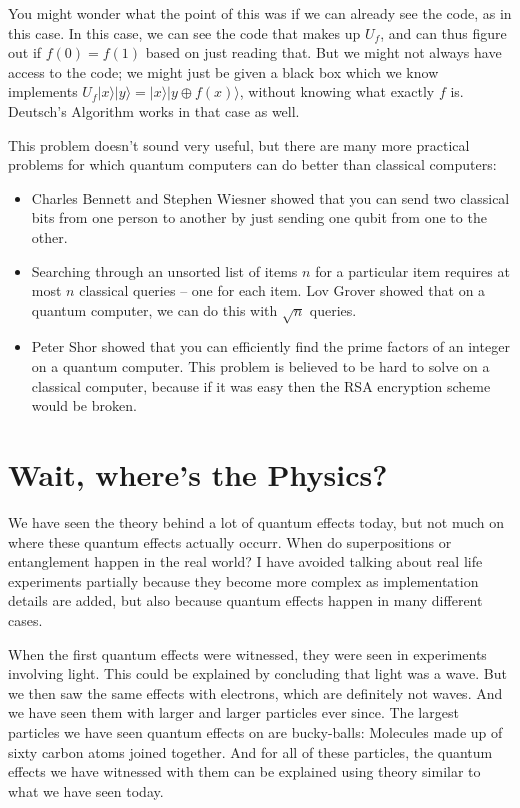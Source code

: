 \documentclass[twocolumn]{article}
\begin{document}
You might wonder what the point of this was if we can already see the code, as in this case. In this case, we can see the code that makes up $U_f$, and can thus figure out if $f(0) = f(1)$ based on just reading that. But we might not always have access to the code; we might just be given a black box which we know implements $U_f|x\rangle|y\rangle = |x\rangle|y \oplus f(x)\rangle$, without knowing what exactly $f$ is. Deutsch's Algorithm works in that case as well.

This problem doesn't sound very useful, but there are many more practical problems for which quantum computers can do better than classical computers:

\begin{itemize}
\item Charles Bennett and Stephen Wiesner showed that you can send two classical bits from one person to another by just sending one qubit from one to the other.
\item Searching through an unsorted list of items $n$ for a particular item requires at most $n$ classical queries -- one for each item. Lov Grover showed that on a quantum computer, we can do this with $\sqrt{n}$ queries.
\item Peter Shor showed that you can efficiently find the prime factors of an integer on a quantum computer. This problem is believed to be hard to solve on a classical computer, because if it was easy then the RSA encryption scheme would be broken.
\end{itemize}

\section{Wait, where's the Physics?}

We have seen the theory behind a lot of quantum effects today, but not much on where these quantum effects actually occurr. When do superpositions or entanglement happen in the real world? I have avoided talking about real life experiments partially because they become more complex as implementation details are added, but also because quantum effects happen in many different cases.

When the first quantum effects were witnessed, they were seen in experiments involving light. This could be explained by concluding that light was a wave. But we then saw the same effects with electrons, which are definitely not waves. And we have seen them with larger and larger particles ever since. The largest particles we have seen quantum effects on are bucky-balls: Molecules made up of sixty carbon atoms joined together. And for all of these particles, the quantum effects we have witnessed with them can be explained using theory similar to what we have seen today.
\end{document}
